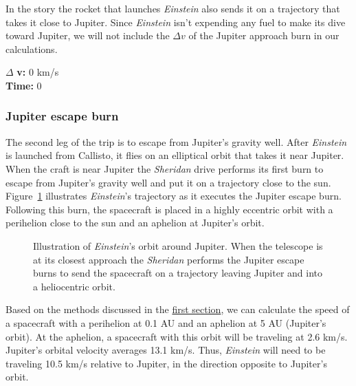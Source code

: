 \documentclass[12pt]{article} %
\begin{document}
In the story the rocket that launches \textit{Einstein} also sends it on a trajectory that takes it close to Jupiter. Since \textit{Einstein} isn't expending any fuel to make its dive toward Jupiter, we will not include the $\Delta v$ of the Jupiter approach burn in our calculations.

$\Delta$ \textbf{v:} 0 km/s\\
\textbf{Time:} 0

\subsubsection{Jupiter escape burn}
The second leg of the trip is to escape from Jupiter's gravity well. After \textit{Einstein} is launched from Callisto, it flies on an elliptical orbit that takes it near Jupiter. When the craft is near Jupiter the \textit{Sheridan} drive performs its first burn to escape from Jupiter's gravity well and put it on a trajectory close to the sun. Figure~\ref{jupiterescape} illustrates \textit{Einstein}'s trajectory as it executes the Jupiter escape burn. Following this burn, the spacecraft is placed in a highly eccentric orbit with a perihelion close to the sun and an aphelion at Jupiter's orbit.

\begin{figure}[H]
	\caption{Illustration of \textit{Einstein}'s orbit around Jupiter. When the telescope is at its closest approach the \textit{Sheridan} performs the Jupiter escape burns to send the spacecraft on a trajectory leaving Jupiter and into a heliocentric orbit.}
	\label{jupiterescape}
\end{figure}

Based on the methods discussed in the \hyperref[subsec:diving]{first section}, we can calculate the speed of a spacecraft with a perihelion at 0.1 AU and an aphelion at 5 AU (Jupiter's orbit). At the aphelion, a spacecraft with this orbit will be traveling at 2.6 km/s. Jupiter's orbital velocity averages 13.1 km/s. Thus, \textit{Einstein} will need to be traveling 10.5 km/s relative to Jupiter, in the direction opposite to Jupiter's orbit.
\end{document}
